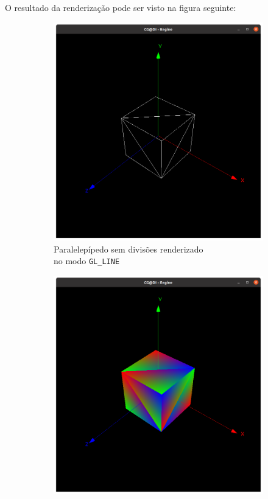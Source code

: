 \documentclass[a4paper, 11pt]{article}
\begin{document}
O resultado da renderização pode ser visto na figura seguinte:

\begin{figure}[H]
\centering
\begin{subfigure}{.5\textwidth}
    \centering
    \includegraphics[width=\textwidth]{img/box_linhas.png}
    \caption{Paralelepípedo sem divisões renderizado \\no modo \texttt{GL\_LINE}}
\end{subfigure}%
\begin{subfigure}{.5\textwidth}
    \centering
    \includegraphics[width=\textwidth]{img/box_preenchida.png}

\end{subfigure}
\end{figure}
\end{document}
